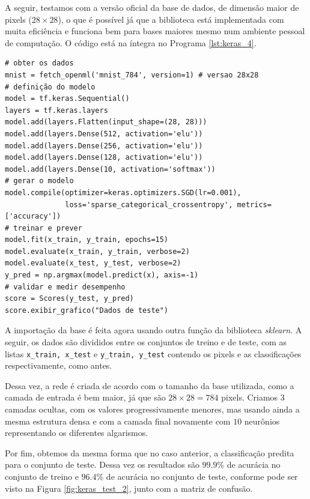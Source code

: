 A seguir, testamos com a versão oficial da base de dados, de dimensão maior de pixels (${28\times28}$), o que é possível já que a biblioteca está implementada com muita eficiência e funciona bem para bases maiores mesmo num ambiente pessoal de computação. O código está na íntegra no Programa \ref{lst:keras_4}.
\newpage
\estiloR
\begin{lstlisting}[caption={Trecho do script \eng{mnist\_keras.py}},label={lst:keras_4},escapeinside={\%}]
# obter os dados
mnist = fetch_openml('mnist_784', version=1) # versao 28x28
# definição do modelo
model = tf.keras.Sequential()
layers = tf.keras.layers
model.add(layers.Flatten(input_shape=(28, 28)))
model.add(layers.Dense(512, activation='elu'))
model.add(layers.Dense(256, activation='elu'))
model.add(layers.Dense(128, activation='elu'))
model.add(layers.Dense(10, activation='softmax'))
# gerar o modelo
model.compile(optimizer=keras.optimizers.SGD(lr=0.001),
              loss='sparse_categorical_crossentropy', metrics=['accuracy'])
# treinar e prever
model.fit(x_train, y_train, epochs=15)
model.evaluate(x_train, y_train, verbose=2)
model.evaluate(x_test, y_test, verbose=2)
y_pred = np.argmax(model.predict(x), axis=-1)
# validar e medir desempenho
score = Scores(y_test, y_pred)
score.exibir_grafico("Dados de teste")
\end{lstlisting}


A importação da base é feita agora usando outra função da biblioteca \emph{sklearn}. A seguir, os dados são divididos entre os conjuntos de treino e de teste, com as listas \texttt{x\_train, x\_test} e \texttt{y\_train, y\_test} contendo os pixels e as classificações respectivamente, como antes.

Dessa vez, a rede é criada de acordo com o tamanho da base utilizada, como a camada de entrada é bem maior, já que são ${28\times28 = 784}$ pixels. Criamos $3$ camadas ocultas, com os valores progressivamente menores, mas usando ainda a mesma estrutura densa e com a camada final novamente com $10$ neurônios representando os diferentes algarismos.

Por fim, obtemos da mesma forma que no caso anterior, a classificação predita para o conjunto de teste. Dessa vez os resultados são $99.9\%$ de acurácia no conjunto de treino e $96.4\%$ de acurácia no conjunto de teste, conforme pode ser visto na Figura \ref{fig:keras_test_2}, junto com a matriz de confusão.

